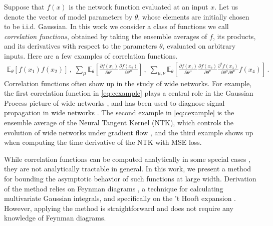 \documentclass[english]{article}
\newcommand{\dho}{\partial}
\newcommand{\lexpp}[1]{\mathbb{E}_{#1}\left[}
\newcommand{\rexp}{\right]}
\newcommand{\pcite}[1]{\cite{#1}}
\begin{document}
Suppose that $f(x)$ is the network function evaluated at an input $x$. Let us denote the vector of model parameters by $\theta$, whose elements are initially chosen to be i.i.d. Gaussian.
In this work we consider a class of functions we call \emph{correlation functions}, obtained by taking the ensemble averages of $f$, its products, and its derivatives with respect to the parameters $\theta$, evaluated on arbitrary inputs.
Here are a few examples of correlation functions.
\begin{align}
  \lexpp{\theta} f(x_1) f(x_2) \rexp \,,\;
  \sum_\mu \lexpp{\theta} \frac{\dho f(x_1)}{\dho \theta^\mu} \frac{\dho f(x_2)}{\dho \theta^\mu} \rexp \,,\;
  \sum_{\mu,\nu} \lexpp{\theta}
  \frac{\dho f(x_1)}{\dho \theta^\mu}
  \frac{\dho f(x_2)}{\dho \theta^\nu}
  \frac{\dho^2 f(x_3)}{\dho \theta^\mu \dho \theta^\nu}
  f(x_4)
  \rexp \,. \label{eq:cexample}
\end{align}
Correlation functions often show up in the study of wide networks.
For example, the first correlation function in \eqref{eq:cexample} plays a central role in the Gaussian Process picture of wide networks \pcite{lee2018deep}, and has been used to diagnose signal propagation in wide networks \pcite{DBLP:journals/corr/abs-1711-04735}.
The second example in \eqref{eq:cexample} is the ensemble average of the Neural Tangent Kernel (NTK), which controls the evolution of wide networks under gradient flow \pcite{ntk}, and the third example shows up when computing the time derivative of the NTK with MSE loss.

While correlation functions can be computed analytically in some special cases \pcite{NIPS2009_3628}, they are not analytically tractable in general.
In this work, we present a method for bounding the asymptotic behavior of such functions at large width.
Derivation of the method relies on Feynman diagrams \pcite{Feynman:1949zx}, a technique for calculating multivariate Gaussian integrals, and specifically on the 't Hooft expansion \pcite{tHooft:1973alw}.
However, applying the method is straightforward and does not require any knowledge of Feynman diagrams.
\end{document}
